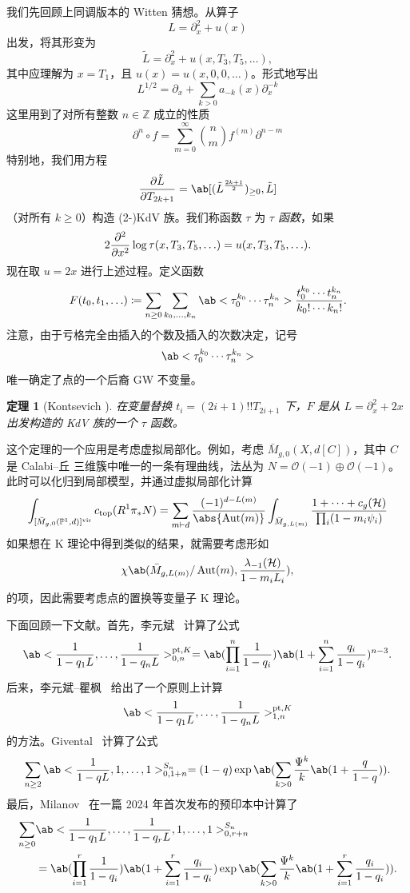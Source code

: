 \documentclass{amsart}
\newtheorem{thm}{定理}[section]
\theoremstyle{definition}
\theoremstyle{remark}
\theoremstyle{plain}
\theoremstyle{definition}
\theoremstyle{remark}
\newcommand{\Z}{\mathbb{Z}}
\renewcommand{\P}{\mathbb{P}}
\newcommand{\mc}[1]{\mathcal{#1}}
\newcommand{\mr}[1]{\mathrm{#1}}
\newcommand{\1}{\mathbf{1}}
\newcommand{\2}{\mathbf{2}}
\newcommand{\3}{\mathbf{3}}
\newcommand{\vir}{\mr{vir}}
\DeclareMathOperator{\Aut}{Aut}
\begin{document}
我们先回顾上同调版本的 Witten 猜想。从算子
\[ L = \partial_x^2 + u(x) \]
出发，将其形变为
\[ \tilde{L} = \partial_x^2 + u(x, T_3, T_5, \ldots), \]
其中应理解为 \(x = T_1\)，且 \(u(x) = u(x, 0, 0,\ldots)\)。形式地写出
\[ L^{1/2} = \partial_x + \sum_{k > 0} a_{-k}(x) \partial_x^{-k} \]
这里用到了对所有整数 \(n \in \Z\) 成立的性质
\[ \partial^n \circ f = \sum_{m = 0}^{\infty} \binom{n}{m} f^{(m)} \partial^{n-m} \]
特别地，我们用方程
\[ \pdv{\tilde{L}}{T_{2k+1}} = \ab[(\tilde{L}^{\frac{2k+1}{2}})_{\geq 0}, \tilde{L}] \]
（对所有 \(k \geq 0\)）构造 (2-)KdV 族。我们称函数 \(\tau\) 为 \textit{\(\tau\) 函数}，如果
\[ 2 \pdv[2]{}{x}\log \tau(x, T_3, T_5, \ldots) = u(x, T_3, T_5, \ldots). \]
现在取 \(u = 2x\) 进行上述过程。定义函数
\[ F(t_0, t_1, \ldots) \coloneqq \sum_{n \geq 0} \sum_{k_0, \ldots, k_n} \ab<\tau_0^{k_0} \cdots \tau_n^{k_n}> \frac{t_0^{k_0} \cdots t_n^{k_n}}{k_0! \cdots k_n!}. \]
注意，由于亏格完全由插入的个数及插入的次数决定，记号
\[ \ab<\tau_0^{k_0} \cdots \tau_n^{k_n}> \]
唯一确定了点的一个后裔 GW 不变量。

\begin{thm}[Kontsevich {\cite{Kontsevich1992}}]
    在变量替换 \(t_i = (2i+1)!! T_{2i+1}\) 下，\(F\) 是从 \(L = \partial_x^2 + 2x\) 出发构造的 KdV 族的一个 \(\tau\) 函数。
\end{thm}

这个定理的一个应用是考虑虚拟局部化。例如，考虑 \(\bar{M}_{g,0}(X, d[C])\)，其中 \(C\) 是 Calabi--丘 三维簇中唯一的一条有理曲线，法丛为 \(N = \mc{O}(-1)\oplus \mc{O}(-1)\)。此时可以化归到局部模型，并通过虚拟局部化计算
\begin{align*}
    \int_{[\bar{M}_{g,0}(\P^1, d)]^{\vir}} c_{\mr{top}}(R^1 \pi_* N) = \sum_{m \vdash d} \frac{(-1)^{d-L(m)}}{\abs{\Aut(m)}} \int_{\bar{M}_{g, L(m)}} \frac{1 + \cdots + c_g(\mc{H})}{\prod_i (1-m_i \psi_i)}
\end{align*}
如果想在 K 理论中得到类似的结果，就需要考虑形如
\[ \chi\ab(\bar{M}_{g, L(m)}/\Aut(m), \frac{\lambda_{-1}(\mc{H})}{1-m_i L_i}), \]
的项，因此需要考虑点的置换等变量子 K 理论。

下面回顾一下文献。首先，李元斌~\cite{Lee1997} 计算了公式
\[ \ab<\frac{1}{1-q_1 L}, \ldots, \frac{1}{1-q_n L}>_{0,n}^{\mr{pt}, K} = \ab(\prod_{i=1}^n \frac{1}{1-q_i}) \ab(1 + \sum_{i=1}^n \frac{q_i}{1-q_i})^{n-3}. \]
后来，李元斌--瞿枫~\cite{LeeQu2014} 给出了一个原则上计算
\[ \ab<\frac{1}{1-q_1 L}, \ldots, \frac{1}{1-q_n L}>_{1,n}^{\mr{pt}, K} \]
的方法。Givental~\cite{Givental2017K1} 计算了公式
\[ \sum_{n \geq 2} \ab<\frac{1}{1-q L}, 1, \ldots, 1>_{0,1+n}^{S_n} = (1-q) \exp\ab(\sum_{k > 0} \frac{\Psi^k}{k} \ab(1 + \frac{q}{1-q})). \]
最后，Milanov~\cite{Milanov2025} 在一篇 2024 年首次发布的预印本中计算了
\begin{align*}
    \sum_{n \geq 0}& \ab<\frac{1}{1-q_1 L}, \ldots, \frac{1}{1-q_r L}, 1, \ldots, 1>_{0,r+n}^{S_n} \\
    &= \ab(\prod_{i=1}^{r} \frac{1}{1-q_i})\ab(1 + \sum_{i=1}^r \frac{q_i}{1-q_i}) \exp\ab(\sum_{k > 0} \frac{\Psi^k}{k} \ab(1 + \sum_{i=1}^r \frac{q_i}{1-q_i})).
\end{align*}
\end{document}
